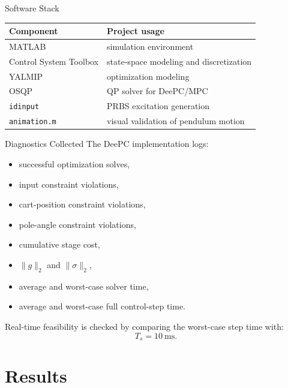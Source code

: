 \documentclass[aspectratio=169,11pt]{beamer}
\newcommand{\Ts}{T_s}
\begin{document}
\begin{frame}{Software Stack}
    \begin{table}
        \centering
        \begin{tabular}{ll}
            \toprule
            Component & Project usage \\
            \midrule
            MATLAB & simulation environment \\
            Control System Toolbox & state-space modeling and discretization \\
            YALMIP & optimization modeling \\
            OSQP & QP solver for DeePC/MPC \\
            \texttt{idinput} & PRBS excitation generation \\
            \texttt{animation.m} & visual validation of pendulum motion \\
            \bottomrule
        \end{tabular}
    \end{table}
\end{frame}

\begin{frame}{Diagnostics Collected}
    The DeePC implementation logs:
    \begin{itemize}
        \item successful optimization solves,
        \item input constraint violations,
        \item cart-position constraint violations,
        \item pole-angle constraint violations,
        \item cumulative stage cost,
        \item $\|g\|_2$ and $\|\sigma\|_2$,
        \item average and worst-case solver time,
        \item average and worst-case full control-step time.
    \end{itemize}

    \vspace{0.3cm}
    Real-time feasibility is checked by comparing the worst-case step time with:
    \[
    \Ts=10~\mathrm{ms}.
    \]
\end{frame}

\section{Results}
\end{document}

